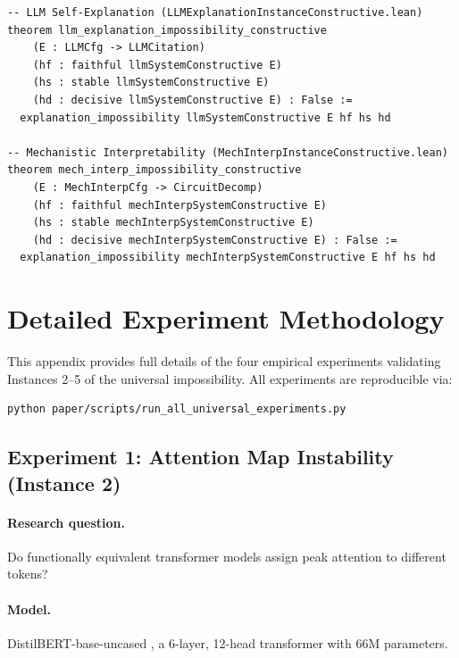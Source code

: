 \documentclass[11pt,a4paper]{article}
\begin{document}
\begin{lstlisting}[caption={Nine constructive instance impossibility theorems}]
-- LLM Self-Explanation (LLMExplanationInstanceConstructive.lean)
theorem llm_explanation_impossibility_constructive
    (E : LLMCfg -> LLMCitation)
    (hf : faithful llmSystemConstructive E)
    (hs : stable llmSystemConstructive E)
    (hd : decisive llmSystemConstructive E) : False :=
  explanation_impossibility llmSystemConstructive E hf hs hd

-- Mechanistic Interpretability (MechInterpInstanceConstructive.lean)
theorem mech_interp_impossibility_constructive
    (E : MechInterpCfg -> CircuitDecomp)
    (hf : faithful mechInterpSystemConstructive E)
    (hs : stable mechInterpSystemConstructive E)
    (hd : decisive mechInterpSystemConstructive E) : False :=
  explanation_impossibility mechInterpSystemConstructive E hf hs hd
\end{lstlisting}

\section{Detailed Experiment Methodology}
\label{app:experiments}

This appendix provides full details of the four empirical experiments
validating Instances 2--5 of the universal impossibility.  All experiments
are reproducible via:
\begin{verbatim}
python paper/scripts/run_all_universal_experiments.py
\end{verbatim}

\subsection{Experiment 1: Attention Map Instability (Instance 2)}
\label{app:exp-attention}

\paragraph{Research question.}
Do functionally equivalent transformer models assign peak attention to
different tokens?

\paragraph{Model.}
DistilBERT-base-uncased \citep{sanh2019distilbert}, a 6-layer, 12-head
transformer with 66M parameters.
\end{document}
